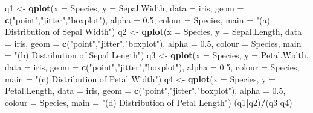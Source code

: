\documentclass[]{article}
\newenvironment{Shaded}{\begin{snugshade}}{\end{snugshade}}
\newcommand{\DataTypeTok}[1]{\textcolor[rgb]{0.13,0.29,0.53}{#1}}
\newcommand{\FloatTok}[1]{\textcolor[rgb]{0.00,0.00,0.81}{#1}}
\newcommand{\KeywordTok}[1]{\textcolor[rgb]{0.13,0.29,0.53}{\textbf{#1}}}
\newcommand{\NormalTok}[1]{#1}
\newcommand{\OperatorTok}[1]{\textcolor[rgb]{0.81,0.36,0.00}{\textbf{#1}}}
\newcommand{\StringTok}[1]{\textcolor[rgb]{0.31,0.60,0.02}{#1}}
\begin{document}
\begin{Shaded}
\begin{Highlighting}[]
\NormalTok{q1 <-}\StringTok{ }\KeywordTok{qplot}\NormalTok{(}\DataTypeTok{x =}\NormalTok{ Species, }\DataTypeTok{y =}\NormalTok{ Sepal.Width, }\DataTypeTok{data =}\NormalTok{ iris, }\DataTypeTok{geom =} \KeywordTok{c}\NormalTok{(}\StringTok{"point"}\NormalTok{,}\StringTok{"jitter"}\NormalTok{,}\StringTok{"boxplot"}\NormalTok{), }
      \DataTypeTok{alpha =} \FloatTok{0.5}\NormalTok{, }\DataTypeTok{colour =}\NormalTok{ Species, }\DataTypeTok{main =} \StringTok{"(a) Distribution of Sepal Width"}\NormalTok{)}
\NormalTok{q2 <-}\StringTok{ }\KeywordTok{qplot}\NormalTok{(}\DataTypeTok{x =}\NormalTok{ Species, }\DataTypeTok{y =}\NormalTok{ Sepal.Length, }\DataTypeTok{data =}\NormalTok{ iris, }\DataTypeTok{geom =} \KeywordTok{c}\NormalTok{(}\StringTok{"point"}\NormalTok{,}\StringTok{"jitter"}\NormalTok{,}\StringTok{"boxplot"}\NormalTok{), }
      \DataTypeTok{alpha =} \FloatTok{0.5}\NormalTok{, }\DataTypeTok{colour =}\NormalTok{ Species, }\DataTypeTok{main =} \StringTok{"(b) Distribution of Sepal Length"}\NormalTok{)}
\NormalTok{q3 <-}\StringTok{ }\KeywordTok{qplot}\NormalTok{(}\DataTypeTok{x =}\NormalTok{ Species, }\DataTypeTok{y =}\NormalTok{ Petal.Width, }\DataTypeTok{data =}\NormalTok{ iris, }\DataTypeTok{geom =} \KeywordTok{c}\NormalTok{(}\StringTok{"point"}\NormalTok{,}\StringTok{"jitter"}\NormalTok{,}\StringTok{"boxplot"}\NormalTok{), }
      \DataTypeTok{alpha =} \FloatTok{0.5}\NormalTok{, }\DataTypeTok{colour =}\NormalTok{ Species, }\DataTypeTok{main =} \StringTok{"(c) Distribution of Petal Width"}\NormalTok{)}
\NormalTok{q4 <-}\StringTok{ }\KeywordTok{qplot}\NormalTok{(}\DataTypeTok{x =}\NormalTok{ Species, }\DataTypeTok{y =}\NormalTok{ Petal.Length, }\DataTypeTok{data =}\NormalTok{ iris, }\DataTypeTok{geom =} \KeywordTok{c}\NormalTok{(}\StringTok{"point"}\NormalTok{,}\StringTok{"jitter"}\NormalTok{,}\StringTok{"boxplot"}\NormalTok{), }
      \DataTypeTok{alpha =} \FloatTok{0.5}\NormalTok{, }\DataTypeTok{colour =}\NormalTok{ Species, }\DataTypeTok{main =} \StringTok{"(d) Distribution of Petal Length"}\NormalTok{)}
\NormalTok{(q1}\OperatorTok{|}\NormalTok{q2)}\OperatorTok{/}\NormalTok{(q3}\OperatorTok{|}\NormalTok{q4)}
\end{Highlighting}
\end{Shaded}
\end{document}
